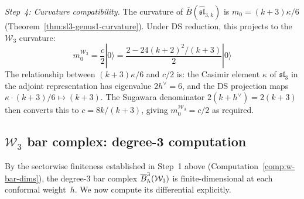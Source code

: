 \begin{computation}
\emph{Step~4: Curvature compatibility.}
The curvature of $\bar{B}(\widehat{\mathfrak{sl}}_{3,k})$ is
$m_0 = (k+3)\kappa/6$ (Theorem~\ref{thm:sl3-genus1-curvature}).
Under DS reduction, this projects to the $\mathcal{W}_3$ curvature:
\[
m_0^{\mathcal{W}_3} = \frac{c}{2}|0\rangle
= \frac{2 - 24(k+2)^2/(k+3)}{2}|0\rangle
\]
The relationship between $(k+3)\kappa/6$ and $c/2$ is:
the Casimir element $\kappa$ of $\mathfrak{sl}_3$ in the adjoint
representation has eigenvalue $2h^\vee = 6$, and the DS projection
maps $\kappa \cdot (k+3)/6 \mapsto (k+3)$.  The Sugawara denominator
$2(k+h^\vee) = 2(k+3)$ then converts this to $c = 8k/(k+3)$,
giving $m_0^{\mathcal{W}_3} = c/2$ as required.
\end{computation}


\subsection{\texorpdfstring{$\mathcal{W}_3$ bar complex: degree-3 computation}{W3 bar complex: degree-3 computation}}
\label{sec:w3-bar-degree3}

By the sectorwise finiteness established in Step~1 above
(Computation~\ref{comp:w-bar-dims}), the degree-3 bar complex
$\overline{B}^3_h(\mathcal{W}_3)$ is finite-dimensional at each
conformal weight~$h$.  We now compute its differential explicitly.

